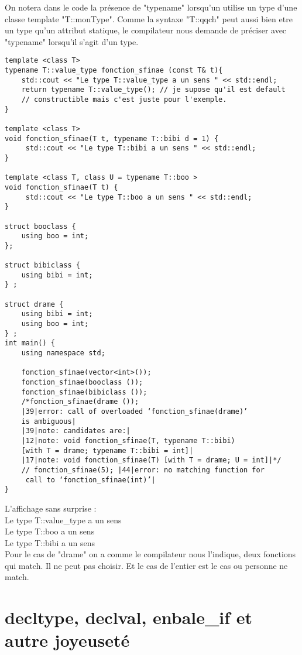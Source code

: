\documentclass[a4paper, 11pt]{article}
\begin{document}
On notera dans le code la présence de "typename" lorsqu'un utilise un type d'une classe template "T::monType". Comme la syntaxe "T::qqch" peut aussi bien etre un type qu'un attribut statique, le compilateur nous demande de préciser avec "typename" lorsqu'il s'agit d'un type.

\begin{lstlisting}
template <class T>
typename T::value_type fonction_sfinae (const T& t){
    std::cout << "Le type T::value_type a un sens " << std::endl;
    return typename T::value_type(); // je supose qu'il est default
    // constructible mais c'est juste pour l'exemple.
}

template <class T>
void fonction_sfinae(T t, typename T::bibi d = 1) {
     std::cout << "Le type T::bibi a un sens " << std::endl;
}

template <class T, class U = typename T::boo >
void fonction_sfinae(T t) {
     std::cout << "Le type T::boo a un sens " << std::endl;
}

struct booclass {
    using boo = int;
};

struct bibiclass {
    using bibi = int;
} ;

struct drame {
    using bibi = int;
    using boo = int;
} ;
int main() {
    using namespace std;

    fonction_sfinae(vector<int>());
    fonction_sfinae(booclass ());
    fonction_sfinae(bibiclass ());
    /*fonction_sfinae(drame ());
    |39|error: call of overloaded ‘fonction_sfinae(drame)’ 
    is ambiguous|
    |39|note: candidates are:|
    |12|note: void fonction_sfinae(T, typename T::bibi) 
    [with T = drame; typename T::bibi = int]|
    |17|note: void fonction_sfinae(T) [with T = drame; U = int]|*/
    // fonction_sfinae(5); |44|error: no matching function for
     call to ‘fonction_sfinae(int)’|
}
\end{lstlisting}
L'affichage sans surprise : \\
Le type T::value\_type a un sens \\
Le type T::boo a un sens \\
Le type T::bibi a un sens \\
Pour le cas de "drame" on a comme le compilateur nous l'indique, deux fonctions qui match. Il ne peut pas choisir.
Et le cas de l'entier est le cas ou personne ne match.

\section{decltype, declval, enbale\_if et autre joyeuseté} 
\end{document}
